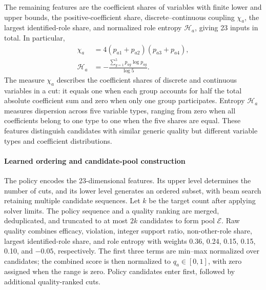 \documentclass[final,5p,times,twocolumn]{elsarticle}
\begin{document}
The remaining features are the coefficient shares of variables with finite lower and upper bounds, the positive-coefficient share, discrete--continuous coupling $\chi_a$, the largest identified-role share, and normalized role entropy $\mathcal H_a$, giving 23 inputs in total. In particular,
\begin{equation}
\begin{aligned}
\chi_a&=4(p_{a1}+p_{a2})(p_{a3}+p_{a4}),\\
\mathcal H_a&=-\frac{\sum_{g=1}^{5}p_{ag}\log p_{ag}}{\log5}.
\end{aligned}
\label{eq:role-information-cn}
\end{equation}
The measure $\chi_a$ describes the coefficient shares of discrete and continuous variables in a cut: it equals one when each group accounts for half the total absolute coefficient sum and zero when only one group participates. Entropy $\mathcal H_a$ measures dispersion across five variable types, ranging from zero when all coefficients belong to one type to one when the five shares are equal. These features distinguish candidates with similar generic quality but different variable types and coefficient distributions.

\paragraph{Learned ordering and candidate-pool construction}
The policy encodes the 23-dimensional features. Its upper level determines the number of cuts, and its lower level generates an ordered subset, with beam search retaining multiple candidate sequences. Let $k$ be the target count after applying solver limits. The policy sequence and a quality ranking are merged, deduplicated, and truncated to at most $2k$ candidates to form pool $\mathcal E$. Raw quality combines efficacy, violation, integer support ratio, non-other-role share, largest identified-role share, and role entropy with weights 0.36, 0.24, 0.15, 0.15, 0.10, and $-0.05$, respectively. The first three terms are min--max normalized over candidates; the combined score is then normalized to $q_a\in[0,1]$, with zero assigned when the range is zero. Policy candidates enter first, followed by additional quality-ranked cuts.
\end{document}

